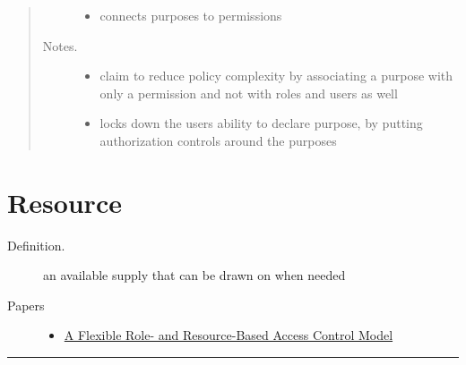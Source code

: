 \documentclass[letterpaper,10pt,english]{sphinxmanual}
\begin{document}
\begin{quote}
\begin{description}
\begin{itemize}
\item {} 
connects purposes to permissions

\end{itemize}

\item[{Notes.}] \leavevmode\begin{itemize}
\item {} 
claim to reduce policy complexity by associating a purpose with only a permission and not with roles and users as well

\item {} 
locks down the users ability to declare purpose, by putting authorization controls around the purposes

\end{itemize}

\end{description}
\end{quote}


\chapter{Resource}
\label{categories/resource:resource}\label{categories/resource::doc}\begin{description}
\item[{Definition.}] \leavevmode
an available supply that can be drawn on when needed

\item[{Papers}] \leavevmode\begin{itemize}
\item {} 
\href{http://ieeexplore.ieee.org/xpls/abs\_all.jsp?arnumber=4609645}{A Flexible Role- and Resource-Based Access Control Model}

\end{itemize}

\end{description}


\bigskip\hrule{}\bigskip
\end{document}
